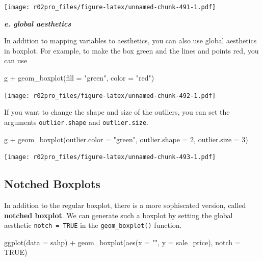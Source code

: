 \documentclass[
]{book}
\newenvironment{Shaded}{\begin{snugshade}}{\end{snugshade}}
\newcommand{\AttributeTok}[1]{\textcolor[rgb]{0.77,0.63,0.00}{#1}}
\newcommand{\ConstantTok}[1]{\textcolor[rgb]{0.00,0.00,0.00}{#1}}
\newcommand{\DecValTok}[1]{\textcolor[rgb]{0.00,0.00,0.81}{#1}}
\newcommand{\FunctionTok}[1]{\textcolor[rgb]{0.00,0.00,0.00}{#1}}
\newcommand{\NormalTok}[1]{#1}
\newcommand{\SpecialCharTok}[1]{\textcolor[rgb]{0.00,0.00,0.00}{#1}}
\newcommand{\StringTok}[1]{\textcolor[rgb]{0.31,0.60,0.02}{#1}}
\begin{document}
\texttt{[image: r02pro\_files/figure-latex/unnamed-chunk-491-1.pdf]}

\textbf{\emph{e. global aesthetics}}

In addition to mapping variables to aesthetics, you can also use global aesthetics in boxplot. For example, to make the box green and the lines and points red, you can use

\begin{Shaded}
\begin{Highlighting}[]
\NormalTok{g }\SpecialCharTok{+} \FunctionTok{geom\_boxplot}\NormalTok{(}\AttributeTok{fill =} \StringTok{"green"}\NormalTok{, }\AttributeTok{color =} \StringTok{"red"}\NormalTok{)}
\end{Highlighting}
\end{Shaded}

\texttt{[image: r02pro\_files/figure-latex/unnamed-chunk-492-1.pdf]}

If you want to change the shape and size of the outliers, you can set the arguments \texttt{outlier.shape} and \texttt{outlier.size}.

\begin{Shaded}
\begin{Highlighting}[]
\NormalTok{g }\SpecialCharTok{+} \FunctionTok{geom\_boxplot}\NormalTok{(}\AttributeTok{outlier.color =} \StringTok{"green"}\NormalTok{, }\AttributeTok{outlier.shape =} \DecValTok{2}\NormalTok{, }\AttributeTok{outlier.size =} \DecValTok{3}\NormalTok{)}
\end{Highlighting}
\end{Shaded}

\texttt{[image: r02pro\_files/figure-latex/unnamed-chunk-493-1.pdf]}

\hypertarget{notched-boxplots}{%
\subsection{Notched Boxplots}\label{notched-boxplots}}

In addition to the regular boxplot, there is a more sophiscated version, called \textbf{notched boxplot}. We can generate such a boxplot by setting the global aesthetic \texttt{notch\ =\ TRUE} in the \texttt{geom\_boxplot()} function.

\begin{Shaded}
\begin{Highlighting}[]
\FunctionTok{ggplot}\NormalTok{(}\AttributeTok{data =}\NormalTok{ sahp) }\SpecialCharTok{+} \FunctionTok{geom\_boxplot}\NormalTok{(}\FunctionTok{aes}\NormalTok{(}\AttributeTok{x =} \StringTok{""}\NormalTok{, }\AttributeTok{y =}\NormalTok{ sale\_price), }\AttributeTok{notch =} \ConstantTok{TRUE}\NormalTok{)}
\end{Highlighting}
\end{Shaded}
\end{document}
